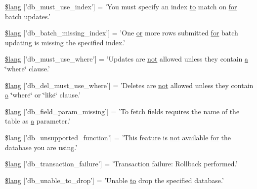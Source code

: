 \begin{DoxyCompactItemize}
\item 
\hyperlink{db__lang_8php_a708419b6b94728c30474ee5fdde3b99b}{\$lang} \mbox{[}'db\-\_\-must\-\_\-use\-\_\-index'\mbox{]} = 'You must specify an index \hyperlink{mathquill_8js_ae3622f38202b3532cd6eae25726945f8}{to} match on \hyperlink{mathquill_8js_a6051bae356f28cb834303745ad2f4d86}{for} batch updates.'
\item 
\hyperlink{db__lang_8php_af946769a3dd5679c60e6f2ef5f7a5aa1}{\$lang} \mbox{[}'db\-\_\-batch\-\_\-missing\-\_\-index'\mbox{]} = 'One \hyperlink{mathquill_8js_a6fdf1c439b25d95597e99492b728acaa}{or} more rows submitted \hyperlink{mathquill_8js_a6051bae356f28cb834303745ad2f4d86}{for} batch updating is missing the specified index.'
\item 
\hyperlink{db__lang_8php_add4bfc65af76fda2c48fa6a2e8d2e506}{\$lang} \mbox{[}'db\-\_\-must\-\_\-use\-\_\-where'\mbox{]} = 'Updates are \hyperlink{mathquill_8js_ac1e1ab538c27d68cc2cbafea74e7412c}{not} allowed unless they contain \hyperlink{bootstrap_8min_8js_a7318f59fb86a4437995ee89c780c51ac}{a} \char`\"{}where\char`\"{} clause.'
\item 
\hyperlink{db__lang_8php_a256ae2de791e589ddc23012f74f390ea}{\$lang} \mbox{[}'db\-\_\-del\-\_\-must\-\_\-use\-\_\-where'\mbox{]} = 'Deletes are \hyperlink{mathquill_8js_ac1e1ab538c27d68cc2cbafea74e7412c}{not} allowed unless they contain \hyperlink{bootstrap_8min_8js_a7318f59fb86a4437995ee89c780c51ac}{a} \char`\"{}where\char`\"{} or \char`\"{}like\char`\"{} clause.'
\item 
\hyperlink{db__lang_8php_a9101352a8cd8c8f34a6b8b1e30c45d8a}{\$lang} \mbox{[}'db\-\_\-field\-\_\-param\-\_\-missing'\mbox{]} = 'To fetch fields requires the name of the table as \hyperlink{bootstrap_8min_8js_a7318f59fb86a4437995ee89c780c51ac}{a} parameter.'
\item 
\hyperlink{db__lang_8php_a77c256be8532e23e8463481f51732116}{\$lang} \mbox{[}'db\-\_\-unsupported\-\_\-function'\mbox{]} = 'This feature is \hyperlink{mathquill_8js_ac1e1ab538c27d68cc2cbafea74e7412c}{not} available \hyperlink{mathquill_8js_a6051bae356f28cb834303745ad2f4d86}{for} the database you are using.'
\item 
\hyperlink{db__lang_8php_a35f225a7ead01f13f8c6423b7c7433a0}{\$lang} \mbox{[}'db\-\_\-transaction\-\_\-failure'\mbox{]} = 'Transaction failure\-: Rollback performed.'
\item 
\hyperlink{db__lang_8php_af391f0d50d64cbb95cd733fa947fdb5e}{\$lang} \mbox{[}'db\-\_\-unable\-\_\-to\-\_\-drop'\mbox{]} = 'Unable \hyperlink{mathquill_8js_ae3622f38202b3532cd6eae25726945f8}{to} drop the specified database.'

\end{DoxyCompactItemize}
